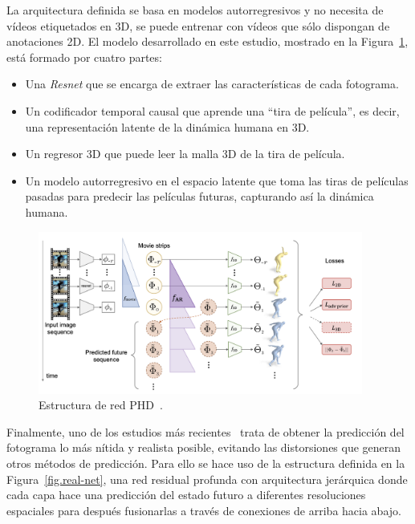 La arquitectura definida se basa en modelos autorregresivos y no necesita de vídeos etiquetados en 3D, se puede entrenar con vídeos que sólo dispongan de anotaciones 2D. El modelo desarrollado en este estudio, mostrado en la Figura~\ref{fig.3d_net}, está formado por cuatro partes:
\begin{itemize}
    \item Una \textit{Resnet} que se encarga de extraer las características de cada fotograma.
    \item Un codificador temporal causal que aprende una ``tira de película'', es decir, una representación latente de la dinámica humana en 3D.
    \item Un regresor 3D que puede leer la malla 3D de la tira de película.
    \item Un modelo autorregresivo en el espacio latente que toma las tiras de películas pasadas para predecir las películas futuras, capturando así la dinámica humana.
\end{itemize}

\vspace{10pt}
\begin{figure}[H]
	\begin{center}
		\includegraphics[width=0.95\textwidth]{ figures/estadoarte/3D-net.png}
		\caption{Estructura de red PHD~\cite{3d}.}
		\label{fig.3d_net}
	\end{center}
\end{figure}
\vspace{-10pt}

Finalmente, uno de los estudios más recientes~\cite{photorealistic} trata de obtener la predicción del fotograma lo más nítida y realista posible, evitando las distorsiones que generan otros métodos de predicción. Para ello se hace uso de la estructura definida en la Figura~\ref{fig.real-net}, una red residual profunda con arquitectura jerárquica donde cada capa hace una predicción del estado futuro a diferentes resoluciones espaciales para después fusionarlas a través de conexiones de arriba hacia abajo.

